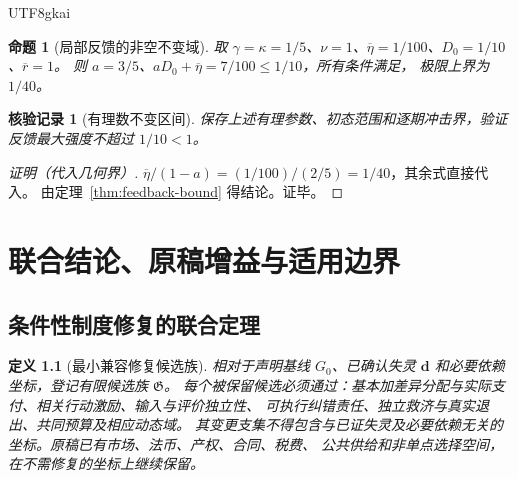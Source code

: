 \documentclass[12pt,a4paper,openany]{report}
\newtheorem{definition}{定义}[chapter]
\newtheorem{proposition}{命题}[chapter]
\newtheorem{Certificate}{核验记录}[chapter]
\begin{document}
\begin{CJK*}{UTF8}{gkai}
\begin{proposition}[局部反馈的非空不变域]
\label{prop:feedback-example}
取 $\gamma=\kappa=1/5$、$\nu=1$、$\overline\eta=1/100$、$D_0=1/10$、$\overline r=1$。
则 $a=3/5$、$aD_0+\overline\eta=7/100\le1/10$，所有条件满足，
极限上界为 $1/40$。
\end{proposition}
\begin{Certificate}[有理数不变区间]
保存上述有理参数、初态范围和逐期冲击界，验证反馈最大强度不超过 $1/10<1$。
\end{Certificate}
\begin{proof}[证明（代入几何界）]
$\overline\eta/(1-a)=(1/100)/(2/5)=1/40$，其余式直接代入。
由定理~\ref{thm:feedback-bound} 得结论。证毕。
\end{proof}

\chapter{联合结论、原稿增益与适用边界}
\label{chap:synthesis}

\section{条件性制度修复的联合定理}

\begin{definition}[最小兼容修复候选族]
\label{def:repair-family}
相对于声明基线 $G_0$、已确认失灵 $\mathbf d$ 和必要依赖坐标，登记有限候选族 $\mathfrak G$。
每个被保留候选必须通过：基本加差异分配与实际支付、相关行动激励、输入与评价独立性、
可执行纠错责任、独立救济与真实退出、共同预算及相应动态域。
其变更支集不得包含与已证失灵及必要依赖无关的坐标。原稿已有市场、法币、产权、合同、税费、
公共供给和非单点选择空间，在不需修复的坐标上继续保留。
\end{definition}


\end{CJK*}
\end{document}
